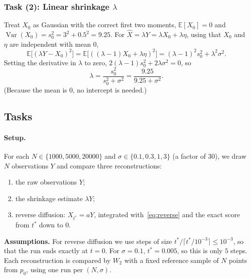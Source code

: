 \documentclass[11pt]{article}
\newcommand{\E}{\mathbb{E}}
\newcommand{\Var}{\operatorname{Var}}
\begin{document}
\subsubsection*{Task (2): Linear shrinkage $\lambda$}

Treat $X_0$ as Gaussian with the correct first two moments, $\E[X_0] = 0$ and $\Var(X_0) = s_0^2 = 3^2 + 0.5^2 = 9.25$. For
$\hat X = \lambda Y = \lambda X_0 + \lambda\eta$, using that $X_0$ and $\eta$ are independent with mean $0$,
\[
\E\bigl[(\lambda Y - X_0)^2\bigr] = \E\bigl[((\lambda-1)X_0 + \lambda\eta)^2\bigr] = (\lambda-1)^2s_0^2 + \lambda^2\sigma^2 .
\]
Setting the derivative in $\lambda$ to zero, $2(\lambda-1)s_0^2 + 2\lambda\sigma^2 = 0$, so
\[
\boxed{\lambda = \frac{s_0^2}{s_0^2+\sigma^2} = \frac{9.25}{9.25+\sigma^2} .}
\]
(Because the mean is $0$, no intercept is needed.)

\subsection*{Tasks}

\paragraph{Setup.} For each $N\in\{1000, 5000, 20000\}$ and $\sigma\in\{0.1, 0.3, 1, 3\}$ (a factor of $30$), we draw $N$ observations $Y$ and
compare three reconstructions:
\begin{enumerate}
\item the raw observations $Y$;
\item the shrinkage estimate $\lambda Y$;
\item reverse diffusion: $X_{t^*} = aY$, integrated with~\eqref{eq:reverse} and the exact score from $t^*$ down to $0$.
\end{enumerate}
\textbf{Assumptions.} For reverse diffusion we use steps of size $t^*/\lceil t^*/10^{-3}\rceil\le10^{-3}$, so that the run ends exactly at
$t=0$. For $\sigma=0.1$, $t^* = 0.005$, so this is only $5$ steps. Each reconstruction is compared by $W_2$ with a fixed reference sample of $N$
points from $p_0$, using one run per $(N,\sigma)$.
\end{document}
